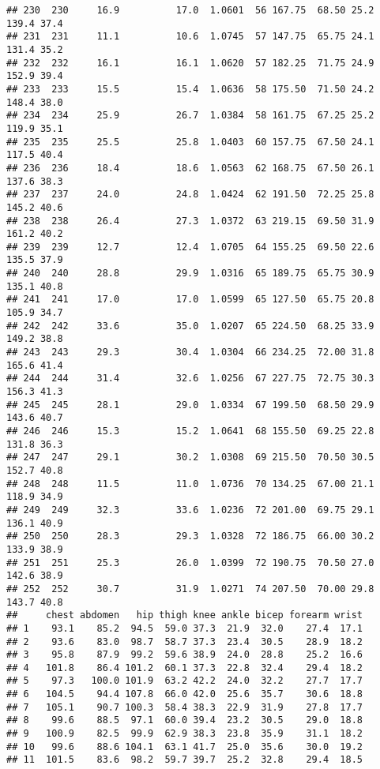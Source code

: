 \documentclass[
]{book}
\theoremstyle{definition}
\theoremstyle{definition}
\theoremstyle{definition}
\theoremstyle{definition}
\theoremstyle{remark}
\begin{document}
\begin{verbatim}
## 230  230     16.9          17.0  1.0601  56 167.75  68.50 25.2    139.4 37.4
## 231  231     11.1          10.6  1.0745  57 147.75  65.75 24.1    131.4 35.2
## 232  232     16.1          16.1  1.0620  57 182.25  71.75 24.9    152.9 39.4
## 233  233     15.5          15.4  1.0636  58 175.50  71.50 24.2    148.4 38.0
## 234  234     25.9          26.7  1.0384  58 161.75  67.25 25.2    119.9 35.1
## 235  235     25.5          25.8  1.0403  60 157.75  67.50 24.1    117.5 40.4
## 236  236     18.4          18.6  1.0563  62 168.75  67.50 26.1    137.6 38.3
## 237  237     24.0          24.8  1.0424  62 191.50  72.25 25.8    145.2 40.6
## 238  238     26.4          27.3  1.0372  63 219.15  69.50 31.9    161.2 40.2
## 239  239     12.7          12.4  1.0705  64 155.25  69.50 22.6    135.5 37.9
## 240  240     28.8          29.9  1.0316  65 189.75  65.75 30.9    135.1 40.8
## 241  241     17.0          17.0  1.0599  65 127.50  65.75 20.8    105.9 34.7
## 242  242     33.6          35.0  1.0207  65 224.50  68.25 33.9    149.2 38.8
## 243  243     29.3          30.4  1.0304  66 234.25  72.00 31.8    165.6 41.4
## 244  244     31.4          32.6  1.0256  67 227.75  72.75 30.3    156.3 41.3
## 245  245     28.1          29.0  1.0334  67 199.50  68.50 29.9    143.6 40.7
## 246  246     15.3          15.2  1.0641  68 155.50  69.25 22.8    131.8 36.3
## 247  247     29.1          30.2  1.0308  69 215.50  70.50 30.5    152.7 40.8
## 248  248     11.5          11.0  1.0736  70 134.25  67.00 21.1    118.9 34.9
## 249  249     32.3          33.6  1.0236  72 201.00  69.75 29.1    136.1 40.9
## 250  250     28.3          29.3  1.0328  72 186.75  66.00 30.2    133.9 38.9
## 251  251     25.3          26.0  1.0399  72 190.75  70.50 27.0    142.6 38.9
## 252  252     30.7          31.9  1.0271  74 207.50  70.00 29.8    143.7 40.8
##     chest abdomen   hip thigh knee ankle bicep forearm wrist
## 1    93.1    85.2  94.5  59.0 37.3  21.9  32.0    27.4  17.1
## 2    93.6    83.0  98.7  58.7 37.3  23.4  30.5    28.9  18.2
## 3    95.8    87.9  99.2  59.6 38.9  24.0  28.8    25.2  16.6
## 4   101.8    86.4 101.2  60.1 37.3  22.8  32.4    29.4  18.2
## 5    97.3   100.0 101.9  63.2 42.2  24.0  32.2    27.7  17.7
## 6   104.5    94.4 107.8  66.0 42.0  25.6  35.7    30.6  18.8
## 7   105.1    90.7 100.3  58.4 38.3  22.9  31.9    27.8  17.7
## 8    99.6    88.5  97.1  60.0 39.4  23.2  30.5    29.0  18.8
## 9   100.9    82.5  99.9  62.9 38.3  23.8  35.9    31.1  18.2
## 10   99.6    88.6 104.1  63.1 41.7  25.0  35.6    30.0  19.2
## 11  101.5    83.6  98.2  59.7 39.7  25.2  32.8    29.4  18.5

\end{verbatim}
\end{document}
